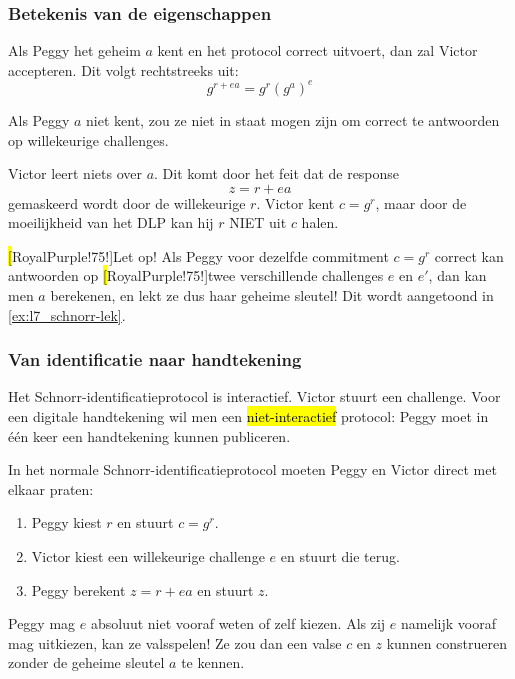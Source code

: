 \subsubsection{Betekenis van de eigenschappen}


Als Peggy het geheim $a$ kent en het protocol correct uitvoert, dan zal Victor accepteren. Dit volgt rechtstreeks uit:
\begin{equation*}
    g^{r + ea} = g^r\left(g^a\right)^e
\end{equation*}


Als Peggy $a$ niet kent, zou ze niet in staat mogen zijn om correct te antwoorden op willekeurige challenges.


Victor leert niets over $a$. Dit komt door het feit dat de response
\begin{equation*}
    z = r + ea
\end{equation*}
gemaskeerd wordt door de willekeurige $r$. Victor kent $c=g^r$, maar door de moeilijkheid van het DLP kan hij $r$ NIET uit $c$ halen.

\begin{barbox}[RoyalPurple!75][gray!3]
    \hl[RoyalPurple!75!]{Let op!} Als Peggy voor dezelfde commitment $c=g^r$ correct kan antwoorden op \hl[RoyalPurple!75!]{twee verschillende challenges} $e$ en $e'$, dan kan men $a$ berekenen, en lekt ze dus haar geheime sleutel! Dit wordt aangetoond in \cref{ex:l7_schnorr-lek}.
\end{barbox}

\subsubsection{Van identificatie naar handtekening}

Het Schnorr-identificatieprotocol is interactief. Victor stuurt een challenge. Voor een digitale handtekening wil men een \hl{niet-interactief} protocol: Peggy moet in één keer een handtekening kunnen publiceren.

In het normale Schnorr-identificatieprotocol moeten Peggy en Victor direct met elkaar praten:
\begin{enumerate}
    \item Peggy kiest $r$ en stuurt $c = g^r$.
    \item Victor kiest een willekeurige challenge $e$ en stuurt die terug.
    \item Peggy berekent $z = r + ea$ en stuurt $z$.
\end{enumerate}
Peggy mag $e$ absoluut niet vooraf weten of zelf kiezen. Als zij $e$ namelijk vooraf mag uitkiezen, kan ze valsspelen! Ze zou dan een valse $c$ en $z$ kunnen construeren zonder de geheime sleutel $a$ te kennen.

